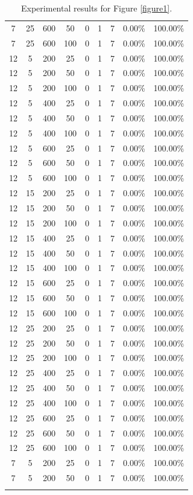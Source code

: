 {\begin{longtable}{| c | c | c | c | c | c | c | c | c |}
 7 & 25 & 600 & 50 & 0 & 1 & 7 & 0.00\% & 100.00\%   \\
 7 & 25 & 600 & 100 & 0 & 1 & 7 & 0.00\% & 100.00\%   \\
 12 & 5 & 200 & 25 & 0 & 1 & 7 & 0.00\% & 100.00\%   \\
 12 & 5 & 200 & 50 & 0 & 1 & 7 & 0.00\% & 100.00\%   \\
 12 & 5 & 200 & 100 & 0 & 1 & 7 & 0.00\% & 100.00\%   \\
 12 & 5 & 400 & 25 & 0 & 1 & 7 & 0.00\% & 100.00\%   \\
 12 & 5 & 400 & 50 & 0 & 1 & 7 & 0.00\% & 100.00\%   \\
 12 & 5 & 400 & 100 & 0 & 1 & 7 & 0.00\% & 100.00\%   \\
 12 & 5 & 600 & 25 & 0 & 1 & 7 & 0.00\% & 100.00\%   \\
 12 & 5 & 600 & 50 & 0 & 1 & 7 & 0.00\% & 100.00\%   \\
 12 & 5 & 600 & 100 & 0 & 1 & 7 & 0.00\% & 100.00\%   \\
 12 & 15 & 200 & 25 & 0 & 1 & 7 & 0.00\% & 100.00\%   \\
 12 & 15 & 200 & 50 & 0 & 1 & 7 & 0.00\% & 100.00\%   \\
 12 & 15 & 200 & 100 & 0 & 1 & 7 & 0.00\% & 100.00\%   \\
 12 & 15 & 400 & 25 & 0 & 1 & 7 & 0.00\% & 100.00\%   \\
 12 & 15 & 400 & 50 & 0 & 1 & 7 & 0.00\% & 100.00\%   \\
 12 & 15 & 400 & 100 & 0 & 1 & 7 & 0.00\% & 100.00\%   \\
 12 & 15 & 600 & 25 & 0 & 1 & 7 & 0.00\% & 100.00\%   \\
 12 & 15 & 600 & 50 & 0 & 1 & 7 & 0.00\% & 100.00\%   \\
 12 & 15 & 600 & 100 & 0 & 1 & 7 & 0.00\% & 100.00\%   \\
 12 & 25 & 200 & 25 & 0 & 1 & 7 & 0.00\% & 100.00\%   \\
 12 & 25 & 200 & 50 & 0 & 1 & 7 & 0.00\% & 100.00\%   \\
 12 & 25 & 200 & 100 & 0 & 1 & 7 & 0.00\% & 100.00\%   \\
 12 & 25 & 400 & 25 & 0 & 1 & 7 & 0.00\% & 100.00\%   \\
 12 & 25 & 400 & 50 & 0 & 1 & 7 & 0.00\% & 100.00\%   \\
 12 & 25 & 400 & 100 & 0 & 1 & 7 & 0.00\% & 100.00\%   \\
 12 & 25 & 600 & 25 & 0 & 1 & 7 & 0.00\% & 100.00\%   \\
 12 & 25 & 600 & 50 & 0 & 1 & 7 & 0.00\% & 100.00\%   \\
 12 & 25 & 600 & 100 & 0 & 1 & 7 & 0.00\% & 100.00\%   \\
 7 & 5 & 200 & 25 & 0 & 1 & 7 & 0.00\% & 100.00\%   \\
 7 & 5 & 200 & 50 & 0 & 1 & 7 & 0.00\% & 100.00\%   \\ \hline
\caption{Experimental results for Figure \ref{figure1}.}
\label{table1}
\end{longtable}
}
\endgroup

